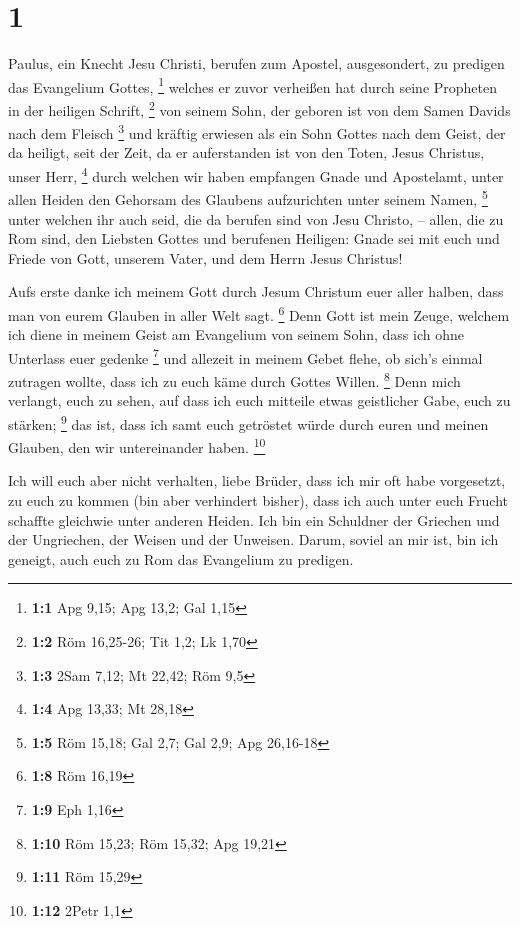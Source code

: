 \hypertarget{section}{%
\section{1}\label{section}}

 Paulus, ein Knecht Jesu Christi, berufen zum Apostel,
ausgesondert, zu predigen das Evangelium Gottes, \footnote{\textbf{1:1}
  Apg 9,15; Apg 13,2; Gal 1,15}  welches er zuvor
verheißen hat durch seine Propheten in der heiligen Schrift, \footnote{\textbf{1:2}
  Röm 16,25-26; Tit 1,2; Lk 1,70}  von seinem Sohn, der
geboren ist von dem Samen Davids nach dem Fleisch \footnote{\textbf{1:3}
  2Sam 7,12; Mt 22,42; Röm 9,5}  und kräftig erwiesen als
ein Sohn Gottes nach dem Geist, der da heiligt, seit der Zeit, da er
auferstanden ist von den Toten, Jesus Christus, unser Herr, \footnote{\textbf{1:4}
  Apg 13,33; Mt 28,18}  durch welchen wir haben empfangen
Gnade und Apostelamt, unter allen Heiden den Gehorsam des Glaubens
aufzurichten unter seinem Namen, \footnote{\textbf{1:5} Röm 15,18; Gal
  2,7; Gal 2,9; Apg 26,16-18}  unter welchen ihr auch
seid, die da berufen sind von Jesu Christo, --  allen, die
zu Rom sind, den Liebsten Gottes und berufenen Heiligen: Gnade sei mit
euch und Friede von Gott, unserem Vater, und dem Herrn Jesus Christus!

 Aufs erste danke ich meinem Gott durch Jesum Christum
euer aller halben, dass man von eurem Glauben in aller Welt sagt.
\footnote{\textbf{1:8} Röm 16,19}  Denn Gott ist mein
Zeuge, welchem ich diene in meinem Geist am Evangelium von seinem Sohn,
dass ich ohne Unterlass euer gedenke \footnote{\textbf{1:9} Eph 1,16}
 und allezeit in meinem Gebet flehe, ob sich's einmal
zutragen wollte, dass ich zu euch käme durch Gottes Willen. \footnote{\textbf{1:10}
  Röm 15,23; Röm 15,32; Apg 19,21}  Denn mich verlangt,
euch zu sehen, auf dass ich euch mitteile etwas geistlicher Gabe, euch
zu stärken; \footnote{\textbf{1:11} Röm 15,29}  das ist,
dass ich samt euch getröstet würde durch euren und meinen Glauben, den
wir untereinander haben. \footnote{\textbf{1:12} 2Petr 1,1}

 Ich will euch aber nicht verhalten, liebe Brüder, dass
ich mir oft habe vorgesetzt, zu euch zu kommen (bin aber verhindert
bisher), dass ich auch unter euch Frucht schaffte gleichwie unter
anderen Heiden.  Ich bin ein Schuldner der Griechen und
der Ungriechen, der Weisen und der Unweisen.  Darum,
soviel an mir ist, bin ich geneigt, auch euch zu Rom das Evangelium zu
predigen.

